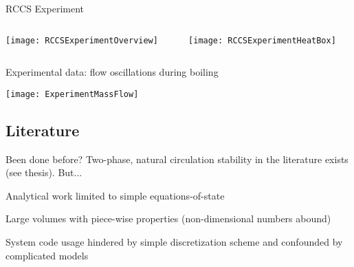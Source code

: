     \begin{frame}[c]{RCCS Experiment}
        \begin{columns}[c]
            \begin{column}{0.35\textwidth}
                \texttt{[image: RCCSExperimentOverview]}
            \end{column}
            \begin{column}{0.60\textwidth}
                \texttt{[image: RCCSExperimentHeatBox]}
            \end{column}
        \end{columns}
    \end{frame}
    
    
    
    \begin{frame}[c]{Experimental data: flow oscillations during boiling}
        \begin{center}
            \texttt{[image: ExperimentMassFlow]}
        \end{center}
    \end{frame}



    \subsection*{Literature}
    \begin{frame}{Been done before?}
        Two-phase, natural circulation stability in the literature exists (see thesis).
        \vspace{1em}
        But...
        \begin{Itemize}
            \item{Analytical work limited to simple equations-of-state}
            \item{Large volumes with piece-wise properties (non-dimensional numbers abound)}
            \item{System code usage hindered by simple discretization scheme and confounded by complicated models}
        \end{Itemize}
    \end{frame}
